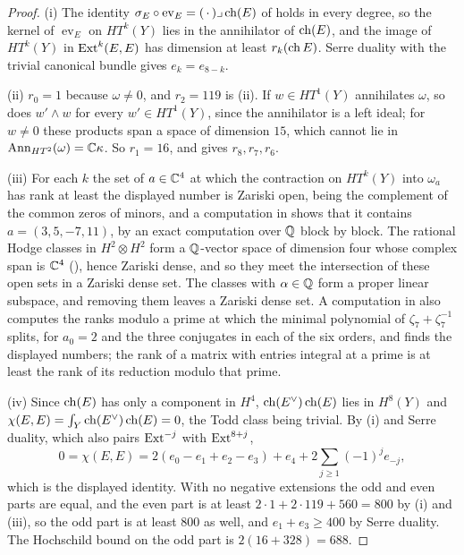 \begin{proof}
(i) The identity $\sigma_{E}\circ\operatorname{ev}_{E}=(\,\cdot\,)\lrcorner
\operatorname{ch}(E)$ of  holds in every degree, so the kernel of
$\operatorname{ev}_{E}$ on $HT^{k}(Y)$ lies in the annihilator of $\operatorname{ch}(E)$,
and the image of $HT^{k}(Y)$ in $\operatorname{Ext}^{k}(E,E)$ has dimension at least
$r_{k}(\operatorname{ch} E)$. Serre duality with the trivial canonical bundle gives
$e_{k}=e_{8-k}$.

(ii) $r_{0}=1$ because $\omega\ne0$, and $r_{2}=119$ is
(ii). If $w\in HT^{1}(Y)$ annihilates $\omega$, so does
$w'\wedge w$ for every $w'\in HT^{1}(Y)$, since the annihilator is a left
ideal; for $w\ne0$ these products span a space of dimension $15$, which cannot
lie in $\operatorname{Ann}_{HT^{2}}(\omega)=\mathbb{C}\kappa$. So $r_{1}=16$, and
 gives $r_{8},r_{7},r_{6}$.

(iii) For each $k$ the set of $a\in\mathbb{C}^{4}$ at which the contraction on
$HT^{k}(Y)$ into $\omega_{a}$ has rank at least the displayed number is Zariski
open, being the complement of the common zeros of minors, and a computation in \cite{BMB26} shows that it contains $a=(3,5,-7,11)$, by an exact
computation over $\mathbb{Q}$ block by block. The rational Hodge classes in
$H^{2}\otimes H^{2}$ form a $\mathbb{Q}$-vector space of dimension four whose complex
span is $\mathbb{C}^{4}$ (), hence Zariski dense, and so they
meet the intersection of these open sets in a Zariski dense set. The classes
with $\alpha\in\mathbb{Q}$ form a proper linear subspace, and removing them leaves a
Zariski dense set. A computation in \cite{BMB26} also computes the ranks modulo a prime at which
the minimal polynomial of $\zeta_{7}+\zeta_{7}^{-1}$ splits, for $a_{0}=2$ and
the three conjugates in each of the six orders, and finds the displayed
numbers; the rank of a matrix with entries integral at a prime is at least the
rank of its reduction modulo that prime.

(iv) Since $\operatorname{ch}(E)$ has only a component in $H^{4}$, $\operatorname{ch}(E^{\vee})\operatorname{ch}(E)$
lies in $H^{8}(Y)$ and $\chi(E,E)=\int_{Y}\operatorname{ch}(E^{\vee})\operatorname{ch}(E)=0$, the Todd
class being trivial. By (i) and Serre duality, which also pairs
$\operatorname{Ext}^{-j}$ with $\operatorname{Ext}^{8+j}$,
\[
  0=\chi(E,E)=2(e_{0}-e_{1}+e_{2}-e_{3})+e_{4}
  +2\sum_{j\ge1}(-1)^{j}e_{-j},
\]
which is the displayed identity. With no negative extensions the odd and even
parts are equal, and the even part is at least $2\cdot1+2\cdot119+560=800$ by
(i) and (iii), so the odd part is at least $800$ as well, and $e_{1}+e_{3}\ge400$ by
Serre duality. The Hochschild bound on the odd part is $2(16+328)=688$.
\end{proof}

